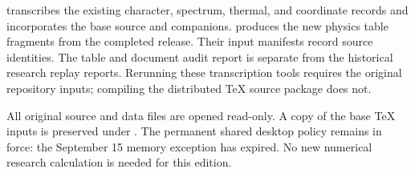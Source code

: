  transcribes the existing character, spectrum,
thermal, and coordinate records and incorporates the base source and
companions.  produces
the new physics table fragments from the completed release. Their input
manifests record source identities. The table and document audit report
is separate from the historical research replay reports. Rerunning these
transcription tools requires the original repository inputs; compiling
the distributed TeX source package does not.

All original source and data files are opened read-only. A copy of the
base TeX inputs is preserved under . The permanent shared
desktop policy remains in force: the September 15 memory exception has
expired. No new numerical research calculation is needed for this edition.

